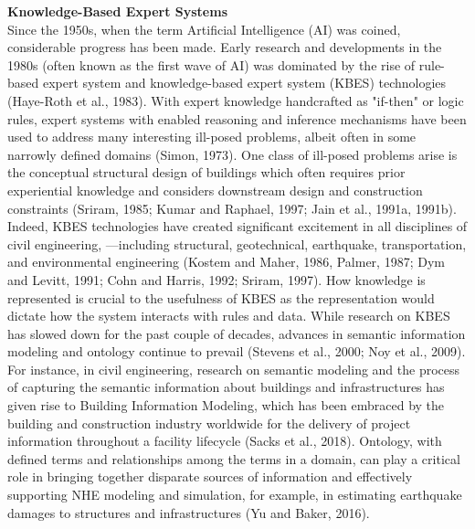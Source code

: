 \noindent\textbf{Knowledge-Based Expert Systems} \\Since the 1950s, when the term Artificial Intelligence (AI) was coined, considerable progress has been made. Early research and developments in the 1980s (often known as the first wave of AI) was dominated by the rise of rule-based expert system and knowledge-based expert system (KBES) technologies (Haye-Roth et al., 1983). With expert knowledge handcrafted as "if-then" or logic rules, expert systems with enabled reasoning and inference mechanisms have been used to address many interesting ill-posed problems, albeit often in some narrowly defined domains (Simon, 1973). One class of ill-posed problems arise is the conceptual structural design of buildings which often requires prior experiential knowledge and considers downstream design and construction constraints (Sriram, 1985; Kumar and Raphael, 1997; Jain et al., 1991a, 1991b). Indeed, KBES technologies have created significant excitement in all disciplines of civil engineering, —including structural, geotechnical, earthquake, transportation, and environmental engineering (Kostem and Maher, 1986, Palmer, 1987; Dym and Levitt, 1991; Cohn and Harris, 1992; Sriram, 1997). How knowledge is represented is crucial to the usefulness of KBES as the representation would dictate how the system interacts with rules and data. While research on KBES has slowed down for the past couple of decades, advances in semantic information modeling and ontology continue to prevail (Stevens et al., 2000; Noy et al., 2009). For instance, in civil engineering, research on semantic modeling and the process of capturing the semantic information about buildings and infrastructures has given rise to Building Information Modeling, which has been embraced by the building and construction industry worldwide for the delivery of project information throughout a facility lifecycle (Sacks et al., 2018). Ontology, with defined terms and relationships among the terms in a domain, can play a critical role in bringing together disparate sources of information and effectively supporting NHE modeling and simulation, for example, in estimating earthquake damages to structures and infrastructures (Yu and Baker, 2016).
\newline
 
